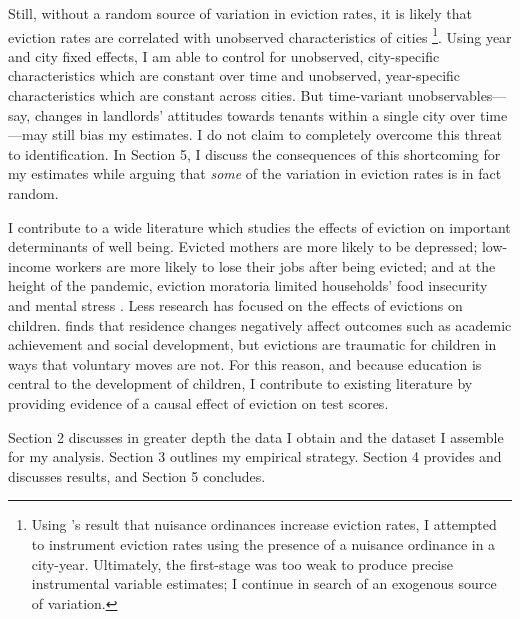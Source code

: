 \documentclass[12pt]{article}
\begin{document}
Still, without a random source of variation in eviction rates, it is likely that eviction rates are correlated with unobserved characteristics of cities \footnote{Using \cite{kroeger_nuisance_2020}'s result that nuisance ordinances increase eviction rates, I attempted to instrument eviction rates using the presence of a nuisance ordinance in a city-year. Ultimately, the first-stage was too weak to produce precise instrumental variable estimates; I continue in search of an exogenous source of variation.}. Using year and city fixed effects, I am able to control for unobserved, city-specific characteristics which are constant over time and unobserved, year-specific characteristics which are constant across cities. But time-variant unobservables—say, changes in landlords' attitudes towards tenants within a single city over time—may still bias my estimates. I do not claim to completely overcome this threat to identification. In Section 5, I discuss the consequences of this shortcoming for my estimates while arguing that \textit{some} of the variation in eviction rates is in fact random. 

I contribute to a wide literature which studies the effects of eviction on important determinants of well being. Evicted mothers are more likely to be depressed; low-income workers are more likely to lose their jobs after being evicted; and at the height of the pandemic, eviction moratoria limited households’ food insecurity and mental stress \citep{desmond_housing_2016, desmond_evictions_2015, an_covid-19_2021}. Less research has focused on the effects of evictions on children. \cite{grigg_school_2012} finds that residence changes negatively affect outcomes such as academic achievement and social development, but evictions are traumatic for children in ways that voluntary moves are not. For this reason, and because education is central to the development of children, I contribute to existing literature by providing evidence of a causal effect of eviction on test scores.

Section 2 discusses in greater depth the data I obtain and the dataset I assemble for my analysis. Section 3 outlines my empirical strategy. Section 4 provides and discusses results, and Section 5 concludes.
\end{document}
